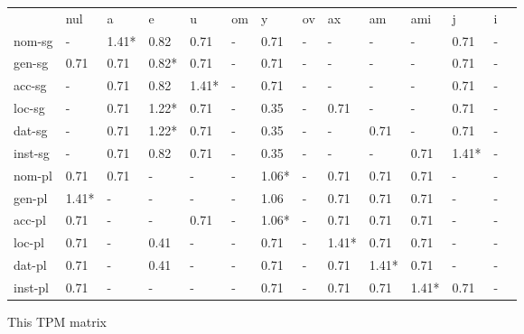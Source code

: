 \documentclass{article}
\begin{document}
\begin{tabular}{llllllllllllll}\toprule
                  &nul     &a       &e       &u       &om      &y       &ov      &ax      &am      &ami     &j       &i       \\ 
nom-sg         &    -   & 1.41*  &  0.82  &  0.71  &    -   &  0.71  &    -   &    -   &    -   &    -   &  0.71  &    -   \\ 
gen-sg         &  0.71  &  0.71  & 0.82*  &  0.71  &    -   &  0.71  &    -   &    -   &    -   &    -   &  0.71  &    -   \\ 
acc-sg         &    -   &  0.71  &  0.82  & 1.41*  &    -   &  0.71  &    -   &    -   &    -   &    -   &  0.71  &    -   \\ 
loc-sg         &    -   &  0.71  & 1.22*  &  0.71  &    -   &  0.35  &    -   &  0.71  &    -   &    -   &  0.71  &    -   \\ 
dat-sg         &    -   &  0.71  & 1.22*  &  0.71  &    -   &  0.35  &    -   &    -   &  0.71  &    -   &  0.71  &    -   \\ 
inst-sg        &    -   &  0.71  &  0.82  &  0.71  &    -   &  0.35  &    -   &    -   &    -   &  0.71  & 1.41*  &    -   \\ 
nom-pl         &  0.71  &  0.71  &    -   &    -   &    -   & 1.06*  &    -   &  0.71  &  0.71  &  0.71  &    -   &    -   \\ 
gen-pl         & 1.41*  &    -   &    -   &    -   &    -   &  1.06  &    -   &  0.71  &  0.71  &  0.71  &    -   &    -   \\ 
acc-pl         &  0.71  &    -   &    -   &  0.71  &    -   & 1.06*  &    -   &  0.71  &  0.71  &  0.71  &    -   &    -   \\ 
loc-pl         &  0.71  &    -   &  0.41  &    -   &    -   &  0.71  &    -   & 1.41*  &  0.71  &  0.71  &    -   &    -   \\ 
dat-pl         &  0.71  &    -   &  0.41  &    -   &    -   &  0.71  &    -   &  0.71  & 1.41*  &  0.71  &    -   &    -   \\ 
inst-pl        &  0.71  &    -   &    -   &    -   &    -   &  0.71  &    -   &  0.71  &  0.71  & 1.41*  &  0.71  &    -   \\ 
\end{tabular}

 \vspace{0.2in}
 

 This TPM matrix  
\end{document}

